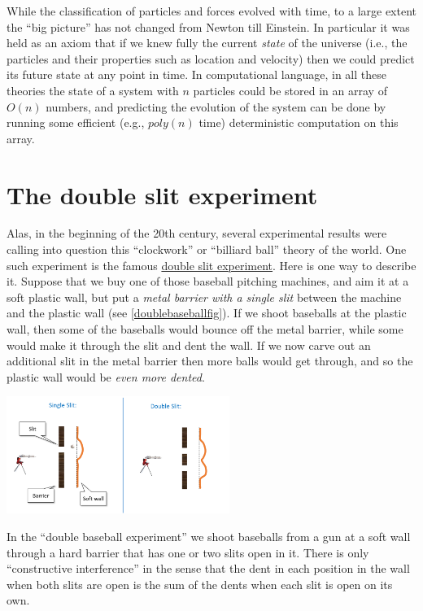 While the classification of particles and forces evolved with time, to a
large extent the ``big picture'' has not changed from Newton till
Einstein. In particular it was held as an axiom that if we knew fully
the current \emph{state} of the universe (i.e., the particles and their
properties such as location and velocity) then we could predict its
future state at any point in time. In computational language, in all
these theories the state of a system with \(n\) particles could be
stored in an array of \(O(n)\) numbers, and predicting the evolution of
the system can be done by running some efficient (e.g., \(poly(n)\)
time) deterministic computation on this array.

\section{The double slit experiment}\label{The-double-slit-experimen}

Alas, in the beginning of the 20th century, several experimental results
were calling into question this ``clockwork'' or ``billiard ball''
theory of the world. One such experiment is the famous
\href{https://en.wikipedia.org/wiki/Double-slit_experiment}{double slit
experiment}. Here is one way to describe it. Suppose that we buy one of
those baseball pitching machines, and aim it at a soft plastic wall, but
put a \emph{metal barrier with a single slit} between the machine and
the plastic wall (see \cref{doublebaseballfig}). If we shoot baseballs
at the plastic wall, then some of the baseballs would bounce off the
metal barrier, while some would make it through the slit and dent the
wall. If we now carve out an additional slit in the metal barrier then
more balls would get through, and so the plastic wall would be
\emph{even more dented}.


\begin{marginfigure}
\centering
\includegraphics[width=\linewidth, height=1.5in, keepaspectratio]{../figure/double_baseball2.png}
\caption{In the ``double baseball experiment'' we shoot baseballs from a
gun at a soft wall through a hard barrier that has one or two slits open
in it. There is only ``constructive interference'' in the sense that the
dent in each position in the wall when both slits are open is the sum of
the dents when each slit is open on its own.}
\label{doublebaseballfig}
\end{marginfigure}

